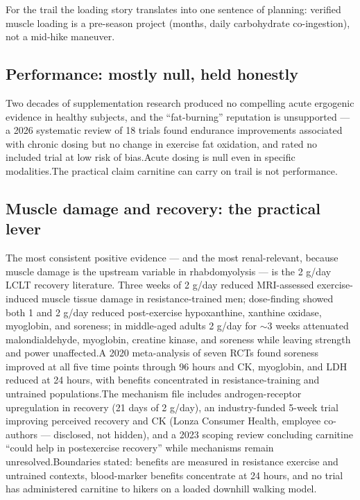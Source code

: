 \documentclass[11pt]{article}
\newcommand{\src}[1]{\allowbreak[#1]}
\begin{document}
For the trail the loading story translates into one sentence of planning: verified muscle loading is a pre-season project (months, daily carbohydrate co-ingestion), not a mid-hike maneuver.\src{135}

\subsection{Performance: mostly null, held honestly}

Two decades of supplementation research produced no compelling acute ergogenic evidence in healthy subjects, and the ``fat-burning'' reputation is unsupported --- a 2026 systematic review of 18 trials found endurance improvements associated with chronic dosing but no change in exercise fat oxidation, and rated no included trial at low risk of bias.\src{148}\src{144}\src{145} Acute dosing is null even in specific modalities.\src{146} The practical claim carnitine can carry on trail is not performance.

\subsection{Muscle damage and recovery: the practical lever}

The most consistent positive evidence --- and the most renal-relevant, because muscle damage is the upstream variable in rhabdomyolysis --- is the 2 g/day LCLT recovery literature. Three weeks of 2 g/day reduced MRI-assessed exercise-induced muscle tissue damage in resistance-trained men; dose-finding showed both 1 and 2 g/day reduced post-exercise hypoxanthine, xanthine oxidase, myoglobin, and soreness; in middle-aged adults 2 g/day for $\sim$3 weeks attenuated malondialdehyde, myoglobin, creatine kinase, and soreness while leaving strength and power unaffected.\src{267}\src{151}\src{149} A 2020 meta-analysis of seven RCTs found soreness improved at all five time points through 96 hours and CK, myoglobin, and LDH reduced at 24 hours, with benefits concentrated in resistance-training and untrained populations.\src{18} The mechanism file includes androgen-receptor upregulation in recovery (21 days of 2 g/day), an industry-funded 5-week trial improving perceived recovery and CK (Lonza Consumer Health, employee co-authors --- disclosed, not hidden), and a 2023 scoping review concluding carnitine ``could help in postexercise recovery'' while mechanisms remain unresolved.\src{150}\src{152}\src{153} Boundaries stated: benefits are measured in resistance exercise and untrained contexts, blood-marker benefits concentrate at 24 hours, and no trial has administered carnitine to hikers on a loaded downhill walking model.\src{18}\src{153}
\end{document}
